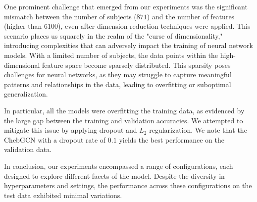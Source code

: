 One prominent challenge that emerged from our experiments was the significant mismatch between the number of subjects ($871$) and the number of features (higher than $6100$), even after dimension reduction techniques were applied. This scenario places us squarely in the realm of the "curse of dimensionality," introducing complexities that can adversely impact the training of neural network models. With a limited number of subjects, the data points within the high-dimensional feature space become sparsely distributed. This sparsity poses challenges for neural networks, as they may struggle to capture meaningful patterns and relationships in the data, leading to overfitting or suboptimal generalization.

In particular, all the models were overfitting the training data, as evidenced by the large gap between the training and validation accuracies. We attempted to mitigate this issue by applying dropout and $L_2$ regularization. We note that the ChebGCN with a dropout rate of $0.1$ yields the best performance on the validation data.

In conclusion, our experiments encompassed a range of configurations, each designed to explore different facets of the model. Despite the diversity in hyperparameters and settings, the performance across these configurations on the test data exhibited minimal variations.